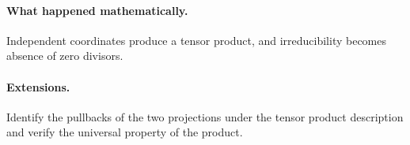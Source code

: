 \paragraph{What happened mathematically.}  Independent coordinates produce a tensor
product, and irreducibility becomes absence of zero divisors.
\paragraph{Extensions.}  Identify the pullbacks of the two projections under the tensor
product description and verify the universal property of the product.
\fi
